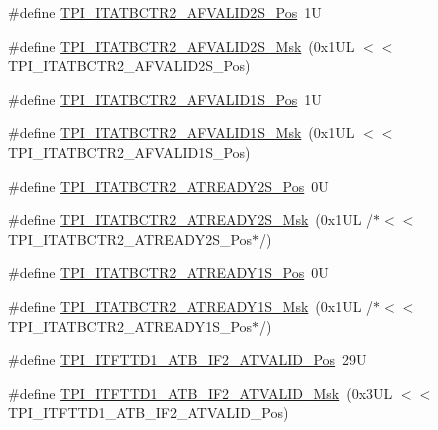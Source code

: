 \begin{DoxyCompactItemize}
\item 
\#define \mbox{\hyperlink{group___c_m_s_i_s___t_p_i_ga7b77f85ad8cad3c00b490ca18ba52263}{T\+P\+I\+\_\+\+I\+T\+A\+T\+B\+C\+T\+R2\+\_\+\+A\+F\+V\+A\+L\+I\+D2\+S\+\_\+\+Pos}}~1U
\item 
\#define \mbox{\hyperlink{group___c_m_s_i_s___t_p_i_ga840a62dd0a903c7c0d90214e57f89f6f}{T\+P\+I\+\_\+\+I\+T\+A\+T\+B\+C\+T\+R2\+\_\+\+A\+F\+V\+A\+L\+I\+D2\+S\+\_\+\+Msk}}~(0x1\+U\+L $<$$<$ T\+P\+I\+\_\+\+I\+T\+A\+T\+B\+C\+T\+R2\+\_\+\+A\+F\+V\+A\+L\+I\+D2\+S\+\_\+\+Pos)
\item 
\#define \mbox{\hyperlink{group___c_m_s_i_s___t_p_i_ga15b83625dedbaa8acaab637185cf4fab}{T\+P\+I\+\_\+\+I\+T\+A\+T\+B\+C\+T\+R2\+\_\+\+A\+F\+V\+A\+L\+I\+D1\+S\+\_\+\+Pos}}~1U
\item 
\#define \mbox{\hyperlink{group___c_m_s_i_s___t_p_i_gaf25272d068154278decc987e101bfac7}{T\+P\+I\+\_\+\+I\+T\+A\+T\+B\+C\+T\+R2\+\_\+\+A\+F\+V\+A\+L\+I\+D1\+S\+\_\+\+Msk}}~(0x1\+U\+L $<$$<$ T\+P\+I\+\_\+\+I\+T\+A\+T\+B\+C\+T\+R2\+\_\+\+A\+F\+V\+A\+L\+I\+D1\+S\+\_\+\+Pos)
\item 
\#define \mbox{\hyperlink{group___c_m_s_i_s___t_p_i_gaa94a190da6db605987bb65d4bd76415a}{T\+P\+I\+\_\+\+I\+T\+A\+T\+B\+C\+T\+R2\+\_\+\+A\+T\+R\+E\+A\+D\+Y2\+S\+\_\+\+Pos}}~0U
\item 
\#define \mbox{\hyperlink{group___c_m_s_i_s___t_p_i_ga7530ebf5f4ae263bf9621d901f9840ee}{T\+P\+I\+\_\+\+I\+T\+A\+T\+B\+C\+T\+R2\+\_\+\+A\+T\+R\+E\+A\+D\+Y2\+S\+\_\+\+Msk}}~(0x1\+U\+L /$\ast$$<$$<$ T\+P\+I\+\_\+\+I\+T\+A\+T\+B\+C\+T\+R2\+\_\+\+A\+T\+R\+E\+A\+D\+Y2\+S\+\_\+\+Pos$\ast$/)
\item 
\#define \mbox{\hyperlink{group___c_m_s_i_s___t_p_i_ga52812ab751c370d2d34e55275d896128}{T\+P\+I\+\_\+\+I\+T\+A\+T\+B\+C\+T\+R2\+\_\+\+A\+T\+R\+E\+A\+D\+Y1\+S\+\_\+\+Pos}}~0U
\item 
\#define \mbox{\hyperlink{group___c_m_s_i_s___t_p_i_gabcc13f970f966e62158aea015b910f6b}{T\+P\+I\+\_\+\+I\+T\+A\+T\+B\+C\+T\+R2\+\_\+\+A\+T\+R\+E\+A\+D\+Y1\+S\+\_\+\+Msk}}~(0x1\+U\+L /$\ast$$<$$<$ T\+P\+I\+\_\+\+I\+T\+A\+T\+B\+C\+T\+R2\+\_\+\+A\+T\+R\+E\+A\+D\+Y1\+S\+\_\+\+Pos$\ast$/)
\item 
\#define \mbox{\hyperlink{group___c_m_s_i_s___t_p_i_gae08894135bf256813f4298ba0ea3964c}{T\+P\+I\+\_\+\+I\+T\+F\+T\+T\+D1\+\_\+\+A\+T\+B\+\_\+\+I\+F2\+\_\+\+A\+T\+V\+A\+L\+I\+D\+\_\+\+Pos}}~29U
\item 
\#define \mbox{\hyperlink{group___c_m_s_i_s___t_p_i_gab90afcecec23b0a84f60858a4becf101}{T\+P\+I\+\_\+\+I\+T\+F\+T\+T\+D1\+\_\+\+A\+T\+B\+\_\+\+I\+F2\+\_\+\+A\+T\+V\+A\+L\+I\+D\+\_\+\+Msk}}~(0x3\+U\+L $<$$<$ T\+P\+I\+\_\+\+I\+T\+F\+T\+T\+D1\+\_\+\+A\+T\+B\+\_\+\+I\+F2\+\_\+\+A\+T\+V\+A\+L\+I\+D\+\_\+\+Pos)
$$
\end{DoxyCompactItemize}
